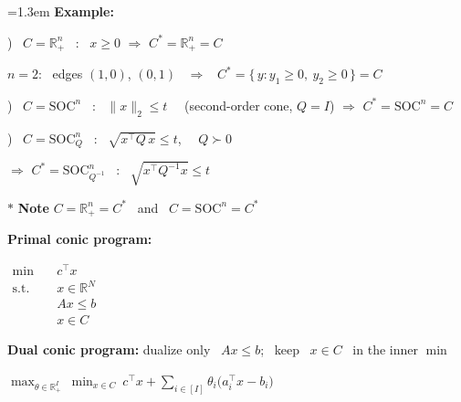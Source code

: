 \documentclass[10pt]{article}
\newenvironment{board}{%
  \par\vspace{4pt}
  \begingroup\leftskip=1.3em\relax\parskip=2pt\relax}{%
  \par\endgroup\vspace{4pt}}
\begin{document}
\begin{board}
\textbf{Example:}
\vspace{8pt}

) \ $C = \mathbb{R}^n_+$ \ : \ $x \ge 0$
\quad $\Longrightarrow$ \quad $C^* = \mathbb{R}^n_+ = C$
\vspace{5pt}

\hspace{0.7cm}$n = 2$: \ edges $(1, 0)$, $(0, 1)$ \ $\Rightarrow$ \ $C^* = \{\, y : y_1 \ge 0, \ y_2 \ge 0 \,\} = C$
\vspace{12pt}

) \ $C = \mathrm{SOC}^n$ \ : \ $\|x\|_2 \le t$ \ \ (second-order cone, $Q = I$)
\quad $\Longrightarrow$ \quad $C^* = \mathrm{SOC}^n = C$
\vspace{12pt}

) \ $C = \mathrm{SOC}_Q^n$ \ : \ $\sqrt{x^{\top}Q\,x} \le t$, \ \ $Q \succ 0$
\vspace{5pt}

\hspace{0.7cm}$\Longrightarrow$ \quad $C^* = \mathrm{SOC}_{Q^{-1}}^n$ \ : \ $\sqrt{x^{\top}Q^{-1}x} \le t$
\vspace{14pt}

$*$ \textbf{Note} \quad $C = \mathbb{R}^n_+ = C^*$ \ and \ $C = \mathrm{SOC}^n = C^*$
\newpage

\textbf{Primal conic program:}
\vspace{2pt}

\begin{center}
$\begin{aligned}
  \min\quad & c^{\top}x \\
  \text{s.t.}\quad & x \in \mathbb{R}^N \\
                   & Ax \le b \\
                   & x \in C
\end{aligned}$
\end{center}
\vspace{12pt}

\textbf{Dual conic program:} \quad dualize only \ $Ax \le b$; \ keep \ $x \in C$ \ in the inner $\min$
\vspace{8pt}

\quad $\displaystyle \max_{\theta \in \mathbb{R}^I_+}\ \min_{x \in C}\
  c^{\top}x + \sum_{i \in [I]} \theta_i \big(a_i^{\top}x - b_i\big)$
\vspace{8pt}


\end{board}
\end{document}
